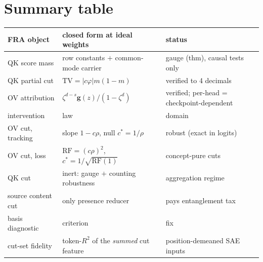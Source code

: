 \documentclass{article}
\newcommand{\gb}{\boldsymbol{g}}
\newcommand{\RF}{\mathrm{RF}}
\begin{document}
\section{Summary table}

\begin{center}
\small
\begin{tabular}{lll}
\toprule
FRA object & closed form at ideal weights & status\\
\midrule
QK score mass & row constants $+$ common-mode carrier & gauge (thm), causal
tests only\\
QK partial cut & $\mathrm{TV} = |c\varphi| m(1-m)$ & verified to 4 decimals\\
OV attribution & $\zeta^{d-s}\gb(z)/(1-\zeta^d)$ & verified; per-head =
checkpoint-dependent\\
\midrule
intervention & law & domain\\
\midrule
OV cut, tracking & slope $1 - c\rho$, null $c^\ast = 1/\rho$ & robust
(exact in logits)\\
OV cut, loss & $\RF = (c\rho)^2$, $c^\ast = 1/\sqrt{\RF(1)}$ & concept-pure
cuts\\
QK cut & inert: gauge $+$ counting robustness & aggregation regime\\
source content cut & only presence reducer & pays entanglement tax\\
\midrule
basis diagnostic & criterion & fix\\
\midrule
cut-set fidelity & token-$R^2$ of the \emph{summed} cut feature &
position-demeaned SAE inputs\\
\bottomrule
\end{tabular}
\end{center}
\end{document}
